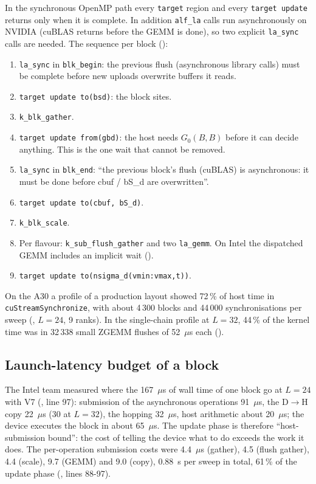 In the synchronous OpenMP path every \texttt{target} region and every \texttt{target update} returns only when it is complete. In addition \texttt{alf\_la} calls run asynchronously on NVIDIA (cuBLAS returns before the GEMM is done), so two explicit \texttt{la\_sync} calls are needed. The sequence per block ():
\begin{enumerate}
\item \texttt{la\_sync} in \texttt{blk\_begin}: the previous flush (asynchronous library calls) must be complete before new uploads overwrite buffers it reads.
\item \texttt{target update to(bsd)}: the block sites.
\item \texttt{k\_blk\_gather}.
\item \texttt{target update from(gbd)}: the host needs $G_0(B,B)$ before it can decide anything. This is the one wait that cannot be removed.
\item \texttt{la\_sync} in \texttt{blk\_end}: ``the previous block's flush (cuBLAS) is asynchronous: it must be done before cbuf / bS\_d are overwritten''.
\item \texttt{target update to(cbuf, bS\_d)}.
\item \texttt{k\_blk\_scale}.
\item Per flavour: \texttt{k\_sub\_flush\_gather} and two \texttt{la\_gemm}. On Intel the dispatched GEMM includes an implicit wait ().
\item \texttt{target update to(nsigma\_d(vmin:vmax,t))}.
\end{enumerate}
On the A30 a profile of a production layout showed 72\,\% of host time in \texttt{cuStreamSynchronize}, with about 4\,300 blocks and 44\,000 synchronisations per sweep (, $L=24$, 9 ranks). %
In the single-chain profile at $L=32$, 44\,\% of the kernel time was in 32\,338 small ZGEMM flushes of 52~$\mu$s each (). %

\subsection{Launch-latency budget of a block}

The Intel team measured where the 167~$\mu$s of wall time of one block go at $L=24$ with V7 (, line 97): %
submission of the asynchronous operations 91~$\mu$s, the D$\to$H copy 22~$\mu$s (30 at $L=32$), the hopping 32~$\mu$s, host arithmetic about 20~$\mu$s; the device executes the block in about 65~$\mu$s. The update phase is therefore ``host-submission bound'': the cost of telling the device what to do exceeds the work it does. The per-operation submission costs were 4.4~$\mu$s (gather), 4.5 (flush gather), 4.4 (scale), 9.7 (GEMM) and 9.0 (copy), 0.88~s per sweep in total, 61\,\% of the update phase (, lines 88-97).

